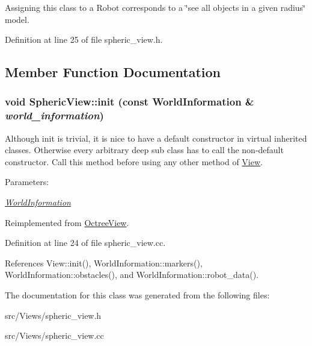 Assigning this class to a Robot corresponds to a \char`\"{}see all objects in a given radius\char`\"{} model. 

Definition at line 25 of file spheric\_\-view.h.

\subsection{Member Function Documentation}
\hypertarget{class_spheric_view_dbd6a1d5e2f17594f82e831c38d35ec6}{
\subsubsection[init]{\setlength{\rightskip}{0pt plus 5cm}void SphericView::init (const {\bf WorldInformation} \& {\em world\_\-information})}}
\label{class_spheric_view_dbd6a1d5e2f17594f82e831c38d35ec6}


Although init is trivial, it is nice to have a default constructor in virtual inherited classes. Otherwise every arbitrary deep sub class has to call the non-default constructor. Call this method before using any other method of \hyperlink{class_view}{View}. \begin{Desc}
\item[Parameters:]
\begin{description}
\item[{\em \hyperlink{class_world_information}{WorldInformation}}]\end{description}
\end{Desc}


Reimplemented from \hyperlink{class_octree_view_800b8d09dbd898769439f1765e7d87b1}{OctreeView}.

Definition at line 24 of file spheric\_\-view.cc.

References View::init(), WorldInformation::markers(), WorldInformation::obstacles(), and WorldInformation::robot\_\-data().

The documentation for this class was generated from the following files:\begin{CompactItemize}
\item 
src/Views/spheric\_\-view.h\item 
src/Views/spheric\_\-view.cc\end{CompactItemize}
